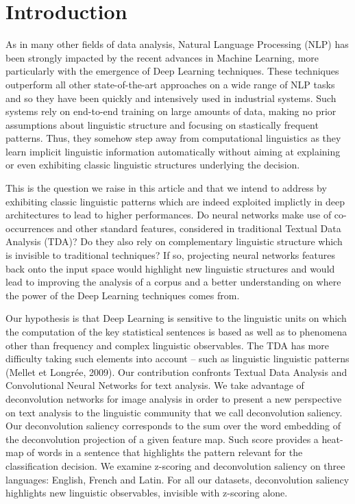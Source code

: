\section{Introduction}
As in many other fields of data analysis, Natural Language Processing (NLP) has been strongly impacted by the recent advances in Machine Learning, more particularly with the emergence of Deep Learning techniques. These techniques outperform all other state-of-the-art approaches on a wide range of NLP tasks and so they have been quickly and intensively used in industrial systems. Such systems rely on end-to-end training on large amounts of data, making no prior assumptions about linguistic structure and focusing on stastically frequent patterns. Thus, they somehow step away from computational linguistics as they learn implicit linguistic information automatically without aiming at explaining or even exhibiting classic linguistic structures underlying the decision.

This is the question we raise in this article and that we intend to address by exhibiting classic linguistic patterns which are indeed exploited implictly in deep architectures to lead to higher performances.
Do neural networks make use of co-occurrences and other standard features, considered in traditional Textual Data Analysis (TDA)? 
Do they also rely on complementary linguistic structure which is invisible to traditional techniques? If so, projecting neural networks features back onto the input space would highlight new linguistic structures and would lead to improving the analysis of a corpus and a better understanding on where the power of the Deep Learning techniques comes from.

Our hypothesis is that Deep Learning is sensitive to the linguistic units on which the computation of the key statistical sentences is based as well as to phenomena other than frequency and complex linguistic 
observables. The TDA has more difficulty taking such elements into account -- such as linguistic linguistic patterns (Mellet et Longrée, 2009).
Our contribution confronts Textual Data Analysis and Convolutional Neural Networks for text analysis. 
We take advantage of deconvolution networks for image analysis in order to present a new perspective on text analysis to the linguistic community that we call deconvolution saliency. Our deconvolution saliency corresponds to the sum over the word embedding of the deconvolution projection of a given feature map. Such score provides a heat-map of words in a sentence that highlights the pattern relevant for the classification decision.
We examine z-scoring and deconvolution saliency on three languages: English, French and Latin. For all our datasets, deconvolution saliency highlights new linguistic observables, invisible with z-scoring alone.


